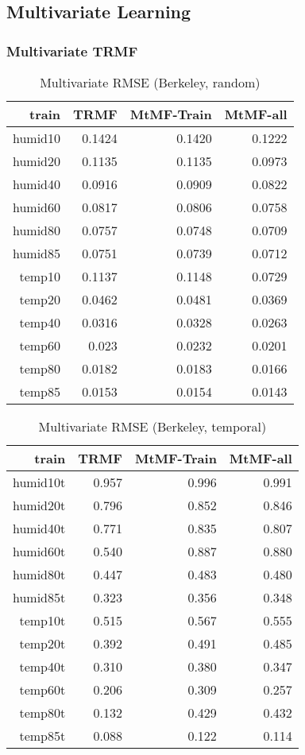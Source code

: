 
\subsection{Multivariate Learning}
\subsubsection{Multivariate TRMF}

\begin{table}[htbp]
\setlength{\tabcolsep}{2pt}
\centering
\caption{Multivariate RMSE (Berkeley, random)}
\label{table:multi_berkeley_random}
\begin{tabular}{r | r r r}
train	&TRMF	&MtMF-Train	&MtMF-all \\ \hline
humid10	&0.1424	&0.1420	&0.1222\\
humid20	&0.1135	&0.1135	&0.0973\\
humid40	&0.0916	&0.0909	&0.0822\\
humid60	&0.0817	&0.0806	&0.0758\\
humid80	&0.0757	&0.0748	&0.0709\\
humid85	&0.0751	&0.0739	&0.0712\\
 temp10	&0.1137	&0.1148	&0.0729\\
 temp20	&0.0462	&0.0481	&0.0369\\
 temp40	&0.0316	&0.0328	&0.0263\\
 temp60	&0.023	&0.0232	&0.0201\\
 temp80	&0.0182	&0.0183	&0.0166\\
 temp85	&0.0153	&0.0154	&0.0143\\
\end{tabular}
\end{table}


\begin{table}[htbp]
\setlength{\tabcolsep}{2pt}
\centering
\caption{Multivariate RMSE (Berkeley, temporal)}
\label{table:multi_berkeley_temporal}
\begin{tabular}{r | r r r}
train	&TRMF	&MtMF-Train	&MtMF-all \\ \hline
humid10t	&0.957&0.996& 	0.991\\
humid20t	&0.796&0.852& 	0.846\\
humid40t	&0.771&0.835& 	0.807\\
humid60t	&0.540&0.887& 	0.880\\
humid80t	&0.447&0.483& 	0.480\\
humid85t	&0.323&0.356& 	0.348\\
 temp10t	&0.515&0.567& 	0.555\\
 temp20t	&0.392&0.491& 	0.485\\
 temp40t	&0.310&0.380& 	0.347\\
 temp60t	&0.206&0.309& 	0.257\\
 temp80t	&0.132&0.429& 	0.432\\
 temp85t	&0.088&0.122& 	0.114\\
\end{tabular}
\end{table}

